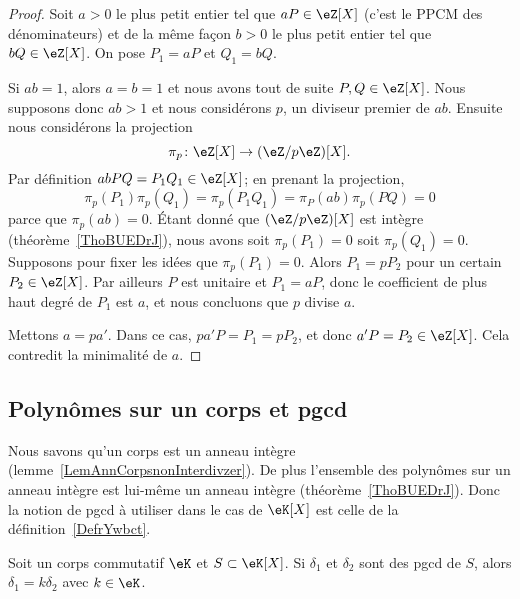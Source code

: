 \begin{proof}
    Soit \( a>0\) le plus petit entier tel que \( aP\in\eZ[X]\) (c'est le PPCM des dénominateurs) et de la même façon \( b>0\) le plus petit entier tel que \( bQ\in \eZ[X]\). On pose \( P_1=aP\) et \( Q_1=bQ\).

    Si \( ab=1\), alors \( a=b=1\) et nous avons tout de suite \( P,Q\in \eZ[X]\). Nous supposons donc \( ab>1\) et nous considérons \( p\), un diviseur premier de \( ab\). Ensuite nous considérons la projection
    \begin{equation}
        \pi_p\colon \eZ[X]\to (\eZ/p\eZ)[X].
    \end{equation}
    Par définition \( abPQ=P_1Q_1\in \eZ[X]\); en prenant la projection,
    \begin{equation}
        \pi_p(P_1)\pi_p(Q_1)=\pi_p(P_1Q_1)=\pi_P(ab)\pi_p(PQ)=0
    \end{equation}
    parce que \( \pi_p(ab)=0\). Étant donné que \( (\eZ/p\eZ)[X]\) est intègre (théorème~\ref{ThoBUEDrJ}), nous avons soit \( \pi_p(P_1)=0\) soit \( \pi_p(Q_1)=0\). Supposons pour fixer les idées que \( \pi_p(P_1)=0\). Alors \( P_1=pP_2\) pour un certain \( P_2\in \eZ[X]\). Par ailleurs \( P\) est unitaire et \( P_1=aP\), donc le coefficient de plus haut degré de \( P_1\) est \( a\), et nous concluons que \( p\) divise \( a\).

    Mettons \( a=pa'\). Dans ce cas, \( pa'P=P_1=pP_2\), et donc \( a'P=P_2\in \eZ[X]\). Cela contredit la minimalité de \( a\).
\end{proof}

\subsection{Polynômes sur un corps et pgcd}

Nous savons qu'un corps est un anneau intègre (lemme~\ref{LemAnnCorpsnonInterdivzer}). De plus l'ensemble des polynômes sur un anneau intègre est lui-même un anneau intègre (théorème~\ref{ThoBUEDrJ}). Donc la notion de pgcd à utiliser dans le cas de \( \eK[X]\) est celle de la définition~\ref{DefrYwbct}.

\begin{lemma}      \label{LEMooXISOooNAMeVX}
    Soit un corps commutatif \( \eK\) et \( S\subset \eK[X]\). Si \( \delta_1\) et \( \delta_2\) sont des pgcd de \( S\), alors \( \delta_1=k\delta_2\) avec \( k\in \eK\).
\end{lemma}

